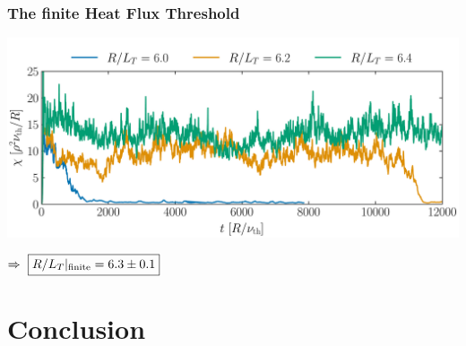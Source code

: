 \documentclass[compress,aspectratio=1610,noflama]{beamer}
\begin{document}
	\begin{frame}
		\frametitle{The finite Heat Flux Threshold}
		\begin{center}
			\includegraphics[width = 0.8\paperwidth]{Comparison/Gradient-Length/S6_rlt6.0-6.2-6.4_boxsize3x3_Ns16_Nvpar48_Nmu9_eflux_comparison.pdf}

			$\Rightarrow~\boxed{R/L_T|_\mathrm{finite} = 6.3 \pm 0.1}$
		\end{center}
	\end{frame}


	\section*{Conclusion}
\end{document}
